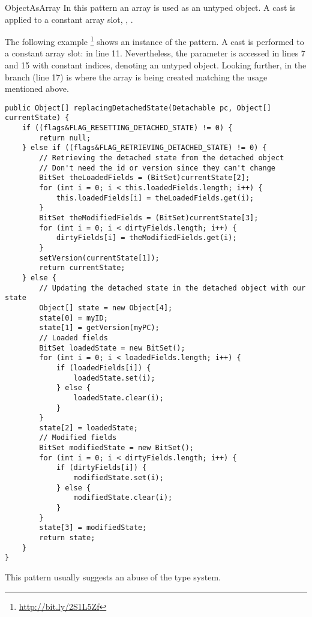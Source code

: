 \begin{pattern}{ObjectAsArray}
In this pattern an array is used as an untyped object.
A cast is applied to a constant array slot, \eg, .

\instances{}
The following example%
\footnote{\url{http://bit.ly/2S1L5Zf}}
shows an instance of the \thisp{} pattern.
A cast is performed to a constant array slot:  in line 11.
Nevertheless, the  parameter is accessed in lines 7 and 15 with constant indices, denoting an untyped object.
Looking further, in the  branch (line 17) is where the array is being created matching the usage mentioned above.

\begin{verbatim}
public Object[] replacingDetachedState(Detachable pc, Object[] currentState) {
    if ((flags&FLAG_RESETTING_DETACHED_STATE) != 0) {
        return null;
    } else if ((flags&FLAG_RETRIEVING_DETACHED_STATE) != 0) {
        // Retrieving the detached state from the detached object
        // Don't need the id or version since they can't change
        BitSet theLoadedFields = (BitSet)currentState[2];
        for (int i = 0; i < this.loadedFields.length; i++) {
            this.loadedFields[i] = theLoadedFields.get(i);
        }
        BitSet theModifiedFields = (BitSet)currentState[3];
        for (int i = 0; i < dirtyFields.length; i++) {
            dirtyFields[i] = theModifiedFields.get(i);
        }
        setVersion(currentState[1]);
        return currentState;
    } else {
        // Updating the detached state in the detached object with our state
        Object[] state = new Object[4];
        state[0] = myID;
        state[1] = getVersion(myPC);
        // Loaded fields
        BitSet loadedState = new BitSet();
        for (int i = 0; i < loadedFields.length; i++) {
            if (loadedFields[i]) {
                loadedState.set(i);
            } else {
                loadedState.clear(i);
            }
        }
        state[2] = loadedState;
        // Modified fields
        BitSet modifiedState = new BitSet();
        for (int i = 0; i < dirtyFields.length; i++) {
            if (dirtyFields[i]) {
                modifiedState.set(i);
            } else {
                modifiedState.clear(i);
            }
        }
        state[3] = modifiedState;
        return state;
    }
}
\end{verbatim}

\detection{}

\discussion{}
This pattern usually suggests an abuse of the type system.

\related{}

\end{pattern}